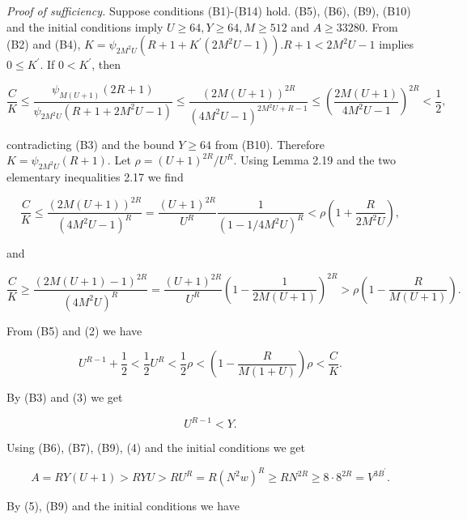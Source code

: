 \documentclass[11pt,a4paper]{article}
\begin{document}
\noindent\emph{Proof of sufficiency.} Suppose conditions (B1)-(B14) hold. (B5), (B6), (B9), (B10) and the initial conditions imply $U \geq 64,\allowbreak  Y \geq 64,\allowbreak  M \geq 512$ and $A \geq 33280$. From (B2) and (B4), $K=\psi_{2 M^{2} U}\left(R+1+K^{\prime}\left(2 M^{2} U-1\right)\right) . R+1<2 M^{2} U-1$ implies $0 \leq K^{\prime}$. If $0<K^{\prime}$, then

\[
\frac{C}{K} \leq \frac{\psi_{M(U+1)}(2 R+1)}{\psi_{2 M^{2} U}\left(R+1+2 M^{2} U-1\right)} \leq \frac{(2 M(U+1))^{2 R}}{\left(4 M^{2} U-1\right)^{2 M^{2} U+R-1}} \leq\left(\frac{2M(U+1)}{4M^{2}U-1}\right)^{2 R}<\frac{1}{2},
\]

contradicting (B3) and the bound $Y\geq64$ from (B10). Therefore $K=\psi_{2 M^{2} U}(R+1)$. Let $\rho=(U+1)^{2 R} / U^{R}$. Using Lemma 2.19 and the two elementary inequalities 2.17 we find


\begin{equation*}
\frac{C}{K} \leq \frac{(2 M(U+1))^{2 R}}{\left(4 M^{2} U-1\right)^{R}}=\frac{(U+1)^{2 R}}{U^{R}} \frac{1}{\left(1-1 / 4 M^{2} U\right)^{R}}<\rho\left(1+\frac{R}{2 M^{2} U}\right), \tag{1}
\end{equation*}


and


\begin{equation*}
\frac{C}{K} \geq \frac{(2 M(U+1)-1)^{2 R}}{\left(4 M^{2} U\right)^{R}}=\frac{(U+1)^{2 R}}{U^{R}}\left(1-\frac{1}{2 M(U+1)}\right)^{2 R}>\rho\left(1-\frac{R}{M(U+1)}\right) . \tag{2}
\end{equation*}


From (B5) and (2) we have


\begin{equation*}
U^{R-1}+\frac{1}{2}<\frac{1}{2} U^{R}<\frac{1}{2} \rho<\left(1-\frac{R}{M(1+U)}\right) \rho<\frac{C}{K} . \tag{3}
\end{equation*}


By (B3) and (3) we get


\begin{equation*}
U^{R-1}<Y . \tag{4}
\end{equation*}


Using (B6), (B7), (B9), (4) and the initial conditions we get


\begin{equation*}
A=R Y(U+1)>R Y U>R U^{R}=R\left(N^{2} w\right)^{R} \geq R N^{2 R} \geq 8 \cdot 8^{2 R}=V^{3 B^{\prime}} . \tag{5}
\end{equation*}


By (5), (B9) and the initial conditions we have
\end{document}
